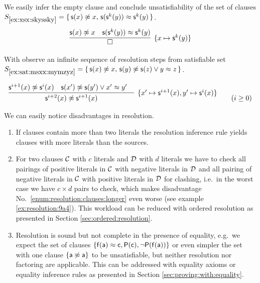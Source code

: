 \begin{example}\label{ex:xsx:skyssky}
	We easily infer the empty clause and
	conclude unsatisfiability of the set of clauses
	$S_{\ref{ex:xsx:skyssky}} = \{\,
	{ \mathsf{s}(x)\not\approx x},\,
	{ \mathsf{s}(\mathsf{s}^k(y))\approx\mathsf{s}^k(y) }
	\,\}$.
	\begin{gather*}
	\infer[\{ x\mapsto\msucc^k(y) \}]
	{
		\square
	}
	{
		\msucc(x)\mNE x & \msucc(\msucc^k(y))\mEQ\msucc^k(y)
	}
	\end{gather*}
\end{example}

\begin{example}\label{ex:sat:msxx:mymzyz}
	With observe an infinite sequence of resolution steps from satisfiable set
	$S_{\ref{ex:sat:msxx:mymzyz}} = \{\, \mathsf{s}(x)\not\approx x,\, \mathsf{s}(y)\not\approx\mathsf{s}(z) \lor y\approx z
	\,\}$.

	\begin{gather*}
	\infer
	[\{ x'\mapsto\msucc^{i+1}(x), y'\mapsto\msucc^{i}(x)\}]
	{
		\msucc^{i+2}(x) \mNE\msucc^{i+1}(x)
	}{
		\msucc^{i+1}(x)\mNE \msucc^i(x) & \msucc(x')\mNE\msucc(y')\lor x'\mEQ y'
		&
	}
	\tag{$i\geq 0$}
	\end{gather*}
\end{example}



We can easily notice disadvantages in resolution.

\begin{enumerate}
	\item\label{enum:resolution:clauses:longer}
	If clauses contain more than two literals the resolution inference rule
	yields clauses with more literals than the sources.

	\item\label{enum:resolution:clauses:multiple}
	For two clauses $\mathcal{C}$ with $c$ literals and $\mathcal{D}$ with $d$ literals
	we have to check all pairings
	of positive literals in $\mathcal{C}$
	with negative literals in $\mathcal{D}$
	and all pairing of negative literals in $\mathcal{C}$
	with positive literals in $\mathcal{D}$ for clashing,
	i.e.~in the worst case we have $c\times d$ pairs to check,
	which makes disadvantage No.~\ref{enum:resolution:clauses:longer} even worse
	(see example \ref{ex:resolution:9a4}).
	This workload can be reduced with ordered resolution as presented in Section
	\ref{sec:ordered:resolution}.

	\item Resolution is sound but not complete in the presence of equality,
	e.g.~we expect the set of clauses $\{
		\mathsf{f}(\mathsf{a}) \approx \mathsf{c}, \mathsf{P}(\mathsf{c}), \lnot\mathsf{P}(\mathsf{f}(\mathsf{a}))
	\}$ or even simpler the set with one clause $\{ \mathsf{a}\not\approx\mathsf{a} \}$ to be unsatisfiable, but neither resolution nor factoring
	are applicable. This can be addressed with equality axioms or equality inference rules
	as presented in Section \ref{sec:proving:with:equality}.
\end{enumerate}

